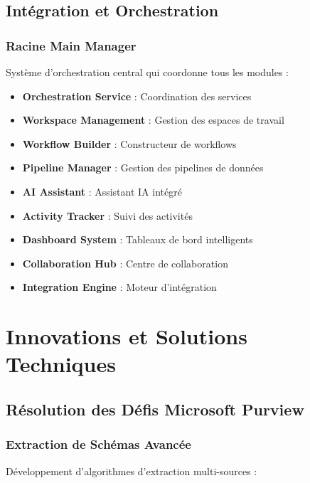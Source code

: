 \documentclass[12pt,a4paper]{article}
\begin{document}
\subsection{Intégration et Orchestration}

\subsubsection{Racine Main Manager}
Système d'orchestration central qui coordonne tous les modules :

\begin{itemize}
    \item \textbf{Orchestration Service} : Coordination des services
    \item \textbf{Workspace Management} : Gestion des espaces de travail
    \item \textbf{Workflow Builder} : Constructeur de workflows
    \item \textbf{Pipeline Manager} : Gestion des pipelines de données
    \item \textbf{AI Assistant} : Assistant IA intégré
    \item \textbf{Activity Tracker} : Suivi des activités
    \item \textbf{Dashboard System} : Tableaux de bord intelligents
    \item \textbf{Collaboration Hub} : Centre de collaboration
    \item \textbf{Integration Engine} : Moteur d'intégration
\end{itemize}

\section{Innovations et Solutions Techniques}

\subsection{Résolution des Défis Microsoft Purview}

\subsubsection{Extraction de Schémas Avancée}
Développement d'algorithmes d'extraction multi-sources :
\end{document}
